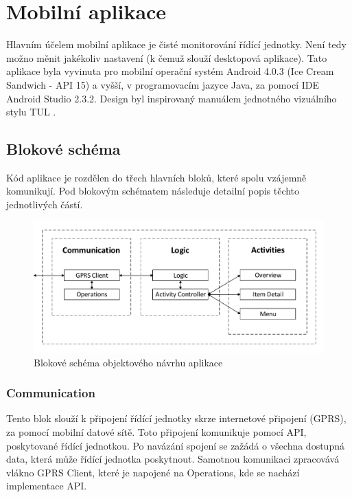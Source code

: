 \documentclass[FM,DP]{tulthesis}  %
\begin{document}

\chapter{Mobilní aplikace}
Hlavním účelem mobilní aplikace je čisté monitorování řídící jednotky. Není tedy možno měnit jakékoliv nastavení (k čemuž slouží desktopová aplikace). Tato aplikace byla vyvinuta pro mobilní operační systém Android 4.0.3 (Ice Cream Sandwich - API 15) a vyšší, v programovacím jazyce Java, za pomocí IDE Android Studio 2.3.2. Design byl inspirovaný manuálem jednotného vizuálního stylu TUL \cite{TULVisual}.

\section{Blokové schéma}
Kód aplikace je rozdělen do třech hlavních bloků, které spolu vzájemně komunikují. Pod blokovým schématem následuje detailní popis těchto jednotlivých částí.

\begin{figure}[H]
\begin{center}
\includegraphics[width=\textwidth]{vector/blokoveSchemaSecurityViewer.pdf}
\caption{Blokové schéma objektového návrhu aplikace}
\label{image}
\end{center}
\end{figure}

\subsection{Communication}
Tento blok slouží k připojení řídící jednotky skrze internetové připojení (GPRS), za pomocí mobilní datové sítě. Toto připojení komunikuje pomocí API, poskytované řídící jednotkou. Po navázání spojení se zažádá o všechna dostupná data, která může řídící jednotka poskytnout. Samotnou komunikaci zpracovává vlákno GPRS Client, které je napojené na Operations, kde se nachází implementace API.
\end{document}
